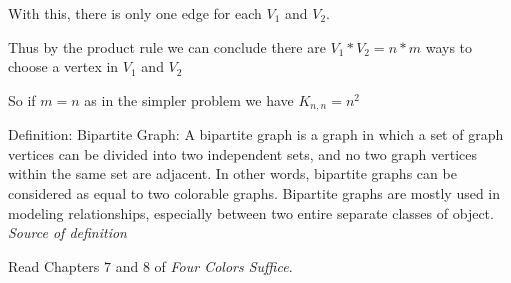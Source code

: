 \documentclass{article}
\begin{document}
With this, there is only one edge for each $V_1$ and $V_2$.

Thus by the product rule we can conclude there are $V_1 * V_2 = n*m$ ways to
choose a vertex in $V_1$ and $V_2$

So if $m=n$ as in the simpler problem we have $K_{n,n} = n^2$


Definition: Bipartite Graph:  A bipartite graph is a graph in which a set of graph
vertices can be divided into two independent sets, and no two graph vertices
within the same set are adjacent. In other words, bipartite graphs can be
considered as equal to two colorable graphs. Bipartite graphs are mostly used
in modeling relationships, especially between two entire separate classes of object.
\emph{Source of definition}~\cite{techopedia}


 

Read Chapters $7$ and $8$ of \emph{Four Colors Suffice}.
\end{document}
